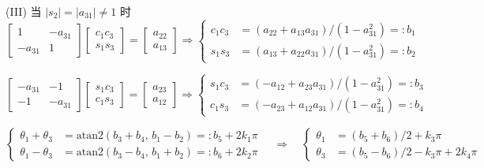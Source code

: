 (III) 当 $|s_2| = |a_{31}| \neq 1$ 时
\begin{equation}
    \begin{bmatrix}
        1 & -a_{31}\\
        -a_{31} & 1
    \end{bmatrix}
    \begin{bmatrix}
        c_1c_3\\
        s_1s_3
    \end{bmatrix}
    = \begin{bmatrix}
        a_{22}\\
        a_{13}
    \end{bmatrix}
    \Rightarrow \left\{\begin{aligned}
        c_1c_3 &= (a_{22} + a_{13}a_{31})/(1-a_{31}^2) =: b_1\\
        s_1s_3 &= (a_{13} + a_{22}a_{31})/(1-a_{31}^2) =: b_2
    \end{aligned}\right.
\end{equation}

\begin{equation}
    \begin{bmatrix}
        -a_{31} & -1\\
        -1 & -a_{31}
    \end{bmatrix}
    \begin{bmatrix}
        s_1c_3\\
        c_1s_3
    \end{bmatrix}
    = \begin{bmatrix}
        a_{23}\\
        a_{12}
    \end{bmatrix}
    \Rightarrow \left\{\begin{aligned}
        s_1c_3 &= (-a_{12} + a_{23}a_{31})/(1-a_{31}^2) =: b_3\\
        c_1s_3 &= (-a_{23} + a_{12}a_{31})/(1-a_{31}^2) =: b_4
    \end{aligned}\right.
\end{equation}

\begin{equation}
    \left\{\begin{aligned}
        \theta_1 + \theta_3 &= \mathrm{atan2}(b_3 + b_4,\, b_1 - b_2) =: b_5 + 2k_1\pi\\
        \theta_1 - \theta_3 &= \mathrm{atan2}(b_3 - b_4,\, b_1 + b_2) =: b_6 + 2k_2\pi
    \end{aligned}\right.
    \quad\Rightarrow\quad
    \left\{\begin{aligned}
        \theta_1 &= (b_5 + b_6)/2 + k_3\pi\\
        \theta_3 &= (b_5 - b_6)/2 - k_3\pi + 2k_4\pi
    \end{aligned}\right.
\end{equation}

